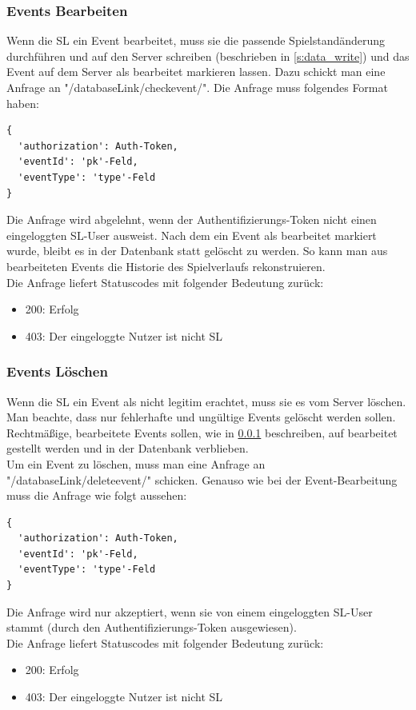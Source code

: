\documentclass[11pt,a4paper,twocolumn]{article}
\begin{document}
\subsubsection{Events Bearbeiten}\label{sss:events_check}
Wenn die SL ein Event bearbeitet, muss sie die passende Spielstandänderung durchführen und auf den Server schreiben (beschrieben in \ref{s:data_write}) und das Event auf dem Server als bearbeitet markieren lassen. Dazu schickt man eine Anfrage an "/databaseLink/checkevent/". Die Anfrage muss folgendes Format haben:
\begin{lstlisting}
{
  'authorization': Auth-Token,
  'eventId': 'pk'-Feld,
  'eventType': 'type'-Feld
}
\end{lstlisting}
Die Anfrage wird abgelehnt, wenn der Authentifizierungs-Token nicht einen eingeloggten SL-User ausweist. Nach dem ein Event als bearbeitet markiert wurde, bleibt es in der Datenbank statt gelöscht zu werden. So kann man aus bearbeiteten Events die Historie des Spielverlaufs rekonstruieren.\\
Die Anfrage liefert Statuscodes mit folgender Bedeutung zurück:
\begin{itemize}
\item 200: Erfolg
\item 403: Der eingeloggte Nutzer ist nicht SL
\end{itemize}
\subsubsection{Events Löschen}\label{sss:events_delete}
Wenn die SL ein Event als nicht legitim erachtet, muss sie es vom Server löschen. Man beachte, dass nur fehlerhafte und ungültige Events gelöscht werden sollen. Rechtmäßige, bearbeitete Events sollen, wie in \ref{sss:events_check} beschreiben, auf bearbeitet gestellt werden und in der Datenbank verblieben.\\
Um ein Event zu löschen, muss man eine Anfrage an "/databaseLink/deleteevent/" schicken. Genauso wie bei der Event-Bearbeitung muss die Anfrage wie folgt aussehen:
\begin{lstlisting}
{
  'authorization': Auth-Token,
  'eventId': 'pk'-Feld,
  'eventType': 'type'-Feld
}
\end{lstlisting}
Die Anfrage wird nur akzeptiert, wenn sie von einem eingeloggten SL-User stammt (durch den Authentifizierungs-Token ausgewiesen).\\
Die Anfrage liefert Statuscodes mit folgender Bedeutung zurück:
\begin{itemize}
\item 200: Erfolg
\item 403: Der eingeloggte Nutzer ist nicht SL
\end{itemize}
\end{document}
